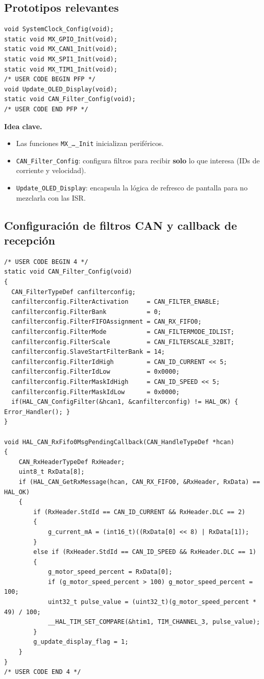 \documentclass[a4paper,12pt]{article}
\begin{document}
\subsection{Prototipos relevantes}
\begin{lstlisting}
void SystemClock_Config(void);
static void MX_GPIO_Init(void);
static void MX_CAN1_Init(void);
static void MX_SPI1_Init(void);
static void MX_TIM1_Init(void);
/* USER CODE BEGIN PFP */
void Update_OLED_Display(void);
static void CAN_Filter_Config(void);
/* USER CODE END PFP */
\end{lstlisting}

\noindent\textbf{Idea clave.}
\begin{itemize}
  \item Las funciones \texttt{MX\_\ldots\_Init} inicializan periféricos.
  \item \texttt{CAN\_Filter\_Config}: configura filtros para recibir \textbf{solo} lo que interesa (IDs de corriente y velocidad).
  \item \texttt{Update\_OLED\_Display}: encapsula la lógica de refresco de pantalla para no mezclarla con las ISR.
\end{itemize}

\subsection{Configuración de filtros CAN y callback de recepción}
\begin{lstlisting}
/* USER CODE BEGIN 4 */
static void CAN_Filter_Config(void)
{
  CAN_FilterTypeDef canfilterconfig;
  canfilterconfig.FilterActivation     = CAN_FILTER_ENABLE;
  canfilterconfig.FilterBank           = 0;
  canfilterconfig.FilterFIFOAssignment = CAN_RX_FIFO0;
  canfilterconfig.FilterMode           = CAN_FILTERMODE_IDLIST;
  canfilterconfig.FilterScale          = CAN_FILTERSCALE_32BIT;
  canfilterconfig.SlaveStartFilterBank = 14;
  canfilterconfig.FilterIdHigh         = CAN_ID_CURRENT << 5;
  canfilterconfig.FilterIdLow          = 0x0000;
  canfilterconfig.FilterMaskIdHigh     = CAN_ID_SPEED << 5;
  canfilterconfig.FilterMaskIdLow      = 0x0000;
  if(HAL_CAN_ConfigFilter(&hcan1, &canfilterconfig) != HAL_OK) { Error_Handler(); }
}

void HAL_CAN_RxFifo0MsgPendingCallback(CAN_HandleTypeDef *hcan)
{
    CAN_RxHeaderTypeDef RxHeader;
    uint8_t RxData[8];
    if (HAL_CAN_GetRxMessage(hcan, CAN_RX_FIFO0, &RxHeader, RxData) == HAL_OK)
    {
        if (RxHeader.StdId == CAN_ID_CURRENT && RxHeader.DLC == 2)
        {
            g_current_mA = (int16_t)((RxData[0] << 8) | RxData[1]);
        }
        else if (RxHeader.StdId == CAN_ID_SPEED && RxHeader.DLC == 1)
        {
            g_motor_speed_percent = RxData[0];
            if (g_motor_speed_percent > 100) g_motor_speed_percent = 100;
            uint32_t pulse_value = (uint32_t)(g_motor_speed_percent * 49) / 100;
            __HAL_TIM_SET_COMPARE(&htim1, TIM_CHANNEL_3, pulse_value);
        }
        g_update_display_flag = 1;
    }
}
/* USER CODE END 4 */
\end{lstlisting}
\end{document}
